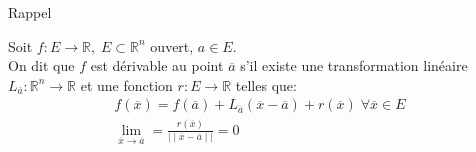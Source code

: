 \begin{parag}{Rappel}
    \begin{definition}
        Soit $f: E \to \mathbb{R} , \; E \subset \mathbb{R}^n $ ouvert, $a \in E$.\\
        On dit que $f$ est dérivable au point $ \overline{a}$ s'il existe une transformation linéaire $L_{ \overline{a}}: \mathbb{R}^n  \to \mathbb{R}$ et une fonction $r: E \to \mathbb{R}$ telles que:
        \begin{align*}
            f( \overline{x}) = f( \overline{a}) + L_{ \overline{a}}( \overline{x} - \overline{a}) + r( \overline{x}) \; \forall \overline{x} \in E\\
            \lim_{ \overline{x} \to \overline{a}} = \frac{r( \overline{x})}{ \mid \mid \overline{x} - \overline{a}\mid \mid} = 0
        \end{align*}
        
    \end{definition}
    

\end{parag}

